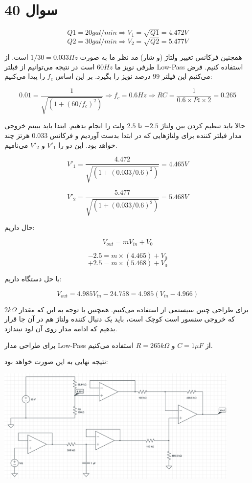 \documentclass[12pt]{article}
\begin{document}
\section*{سوال 40}

$$Q1 = 20 gal/min \Rightarrow V_1 = \sqrt{Q1} = 4.472 V$$
$$Q2 = 30 gal/min \Rightarrow V_2 = \sqrt{Q2} = 5.477 V$$

همچنین فرکانس تغییر ولتاژ (و شار) مد نظر ما به صورت $1/30 = 0.033 Hz$ است. از طرفی نویز ما $60Hz$ است در نتیجه می‌توانیم از فیلتر Low-Pass استفاده کنیم. فرض می‌کنیم این فیلتر $99$ درصد نویز را بگیرد. بر این اساس $f_c$ را پیدا می‌کنیم:

$$0.01 = \frac{1}{\sqrt{(1 + (60 / f_c)^2)}} \Rightarrow f_c = 0.6 Hz \Rightarrow RC = \frac{1}{0.6 \times Pi \times 2} = 0.265$$

حالا باید تنظیم کردن بین ولتاژ $-2.5$ تا $2.5$ ولت را انجام بدهیم. ابتدا باید ببینم خروجی مدار فیلتر کننده برای ولتاژهایی که در ابتدا بدست آوردیم و فرکانس $0.033$ هرتز چند خواهد بود. این دو را $V'_1$ و $V'_2$ می‌نامیم.

$$V'_1 = \frac{4.472}{\sqrt{(1 + (0.033/0.6)^2)}} = 4.465 V$$

$$V'_2 = \frac{5.477}{\sqrt{(1 + (0.033/0.6)^2)}} = 5.468 V$$

حال داریم:

$$V_{out} = m V_{in} + V_0$$

$$-2.5 = m \times (4.465) + V_0$$
$$+2.5 = m \times (5.468) + V_0$$

با حل دستگاه داریم:

$$V_{out} = 4.985 V_{in} -24.758  = 4.985(V_{in} - 4.966)$$

برای طراحی چنین سیستمی از  استفاده می‌کنیم. همچنین با توجه به این که مقدار $2 k \Omega$ که خروجی سنسور است کوچک است، باید یک دنبال کننده ولتاژ هم در آن جا قرار بدهیم که ادامه مدار روی آن لود نیندازد.

برای طراحی مدار Low-Pass از $C=1 \mu F$ و $R = 265 k \Omega$ استفاده می‌کنیم.

نتیجه نهایی به این صورت خواهد بود:



\begin{center}
	\includegraphics[width = 0.9\textwidth]{images/8.png}
\end{center}
\end{document}
